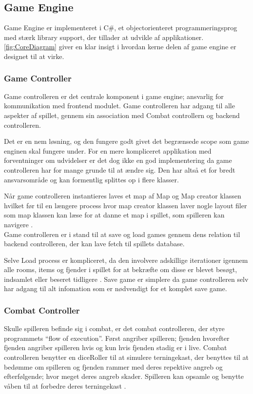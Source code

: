 \subsection{Game Engine}
Game Engine er implementeret i C\#, et objectorienteret programmeringsprog
med stærk library support, der tillader at udvikle af applikationer. 
\autoref{fig:CoreDiagram} giver en klar insigt i hvordan kerne delen af
game engine er designet til at virke. 

\subsubsection{Game Controller}
Game controlleren er det centrale komponent i game engine; ansvarlig for 
kommunikation med frontend modulet. Game controlleren har adgang til alle
aspekter af spillet, gennem sin association med Combat controllern og 
backend controlleren.

\noindent Det er en nem løsning, og den fungere godt givet det begrænsede scope som 
game enginen skal fungere under.
For en mere kompliceret applikation med forventninger om udvidelser er det
dog ikke en god implementering da game controlleren har for mange grunde
til at ændre sig. Den har altså et for bredt ansvarsområde og kan formentlig
splittes op i flere klasser.

\noindent Når game controlleren instantieres laves et map af Map og Map creator klassen
hvilket før til en længere process hvor map creator klassen laver nogle
layout filer som map klassen kan læse for at danne et map i spillet, som 
spilleren kan navigere \parencite[Section 11.3.2][]{TekniskBilag}.\\

\noindent Game controlleren er i stand til at save og load games gennem 
dens relation til backend controlleren, der kan lave fetch til spillets
database.

\noindent Selve Load process er kompliceret, da den involvere adskillige iterationer
igennem alle rooms, items og fjender i spillet for at bekræfte om disse er
blevet besøgt, indsamlet eller beseret tidligere \parencite[Section 11.3.1]
[Figure 55]{TekniskBilag}.
Save game er simplere da game controlleren selv har adgang til alt infomation
som er nødvendigt for et komplet save game.

\subsubsection{Combat Controller}
Skulle spilleren befinde sig i combat, er det combat controlleren, der styre programmets
``flow of execution''. Først angriber spilleren; fjenden hvorefter fjenden angriber spilleren
hvis og kun hvis fjenden stadig er i live. Combat controlleren benytter en diceRoller til
at simulere terningekast, der benyttes til at bedømme om spilleren og fjenden rammer med
deres repektive angreb og efterfølgende; hvor meget deres angreb skader. Spilleren kan opsamle
og benytte våben til at forbedre deres terningekast \parencite[Section 10.3.2][]{TekniskBilag}. 

